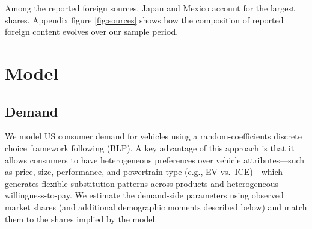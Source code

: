 \documentclass[11pt]{article}
\begin{document}

Among the reported foreign sources, Japan and Mexico account for the largest shares. Appendix figure \ref{fig:sources} shows how the composition of reported foreign content evolves over our sample period.

\section{Model}\label{sec:sec_model}
\subsection{Demand}
We model US consumer demand for vehicles using a random-coefficients discrete choice framework following \cite{berry_automobile_1995} (BLP). A key advantage of this approach is that it allows consumers to have heterogeneous preferences over vehicle attributes---such as price, size, performance, and powertrain type (e.g., EV vs.\ ICE)---which generates flexible substitution patterns across products and heterogeneous willingness-to-pay. We estimate the demand-side parameters using observed market shares (and additional demographic moments described below) and match them to the shares implied by the model.
\end{document}
